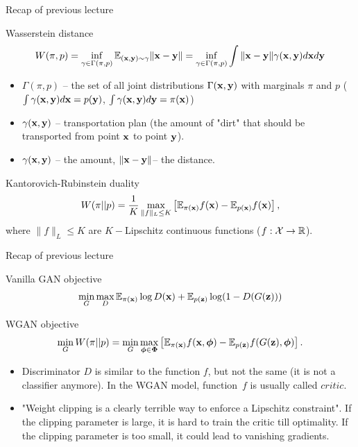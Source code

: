 \begin{frame}{Recap of previous lecture}
		\begin{block}{Wasserstein distance}
			\vspace{-0.5cm}
			\[
				W(\pi, p) = \inf_{\gamma \in \Gamma(\pi, p)} \mathbb{E}_{(\mathbf{x}, \mathbf{y}) \sim \gamma} \| \mathbf{x} - \mathbf{y} \| =  \inf_{\gamma \in \Gamma(\pi, p)} \int \| \mathbf{x} - \mathbf{y} \| \gamma (\mathbf{x}, \mathbf{y}) d \mathbf{x} d \mathbf{y}
			\]
			\vspace{-0.5cm}
			\begin{itemize}
				\item $\Gamma(\pi, p)$ -- the set of all joint distributions $\Gamma (\mathbf{x}, \mathbf{y})$ with marginals $\pi$ and $p$ ($\int \gamma(\mathbf{x}, \mathbf{y}) d \mathbf{x} = p(\mathbf{y})$, $\int \gamma(\mathbf{x}, \mathbf{y}) d \mathbf{y} = \pi(\mathbf{x})$)
				\item $\gamma(\mathbf{x}, \mathbf{y})$ -- transportation plan (the amount of "dirt" that should be transported from point $\mathbf{x}$ to point $\mathbf{y}$).
				\item $\gamma(\mathbf{x}, \mathbf{y})$ -- the amount, $\|\mathbf{x} - \mathbf{y} \|$-- the distance.
			\end{itemize}
		\end{block}
		\begin{block}{Kantorovich-Rubinstein duality}
			\vspace{-0.2cm}
			\[
				W(\pi || p) = \frac{1}{K} \max_{\| f \|_L \leq K} \left[ \mathbb{E}_{\pi(\mathbf{x})} f(\mathbf{x})  - \mathbb{E}_{p(\mathbf{x})} f(\mathbf{x})\right],
			\]
			where $\| f \|_L \leq K$ are $K-$Lipschitz continuous functions ($f: \mathcal{X} \rightarrow \mathbb{R}$).
		\end{block}
\end{frame}
\begin{frame}{Recap of previous lecture}
		\begin{block}{Vanilla GAN objective}
			\vspace{-0.2cm}
			\[
				\min_{G} \max_D \mathbb{E}_{\pi(\mathbf{x})} \log D(\mathbf{x}) + \mathbb{E}_{p(\mathbf{z})} \log (1 - D(G(\mathbf{z})))
			\]
			\vspace{-0.2cm}
		\end{block}
		\begin{block}{WGAN objective}
			\vspace{-0.6cm}
			\[
			\min_{G} W(\pi || p) = \min_{G} \max_{\boldsymbol{\phi} \in \boldsymbol{\Phi}} \left[ \mathbb{E}_{\pi(\mathbf{x})} f(\mathbf{x}, \boldsymbol{\phi})  - \mathbb{E}_{p(\mathbf{z})} f(G(\mathbf{z}), \boldsymbol{\phi} )\right].
			\]
		\end{block}
		\begin{itemize}
			\item Discriminator $D$ is similar to the function $f$, but not the same (it is not a classifier anymore). In the WGAN model, function~$f$ is usually called $\textit{critic}$.
			\item "Weight clipping is a clearly terrible way to enforce a Lipschitz constraint". If the clipping parameter is large, it is hard to train the critic till optimality. If the clipping parameter is too small, it could lead to vanishing gradients.
		\end{itemize}
		
\end{frame}
